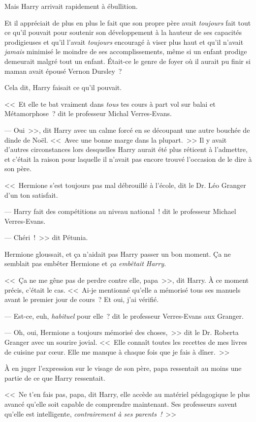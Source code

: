 Mais Harry arrivait rapidement à ébullition.

Et il appréciait de plus en plus le fait que son propre père avait \emph{toujours} fait tout ce qu'il pouvait pour soutenir son développement à la hauteur de ses capacités prodigieuses et qu'il l'avait \emph{toujours} encouragé à viser plus haut et qu'il n'avait \emph{jamais} minimisé le moindre de ses accomplissements, même si un enfant prodige demeurait malgré tout un enfant. Était-ce le genre de foyer où il aurait pu finir si maman avait épousé Vernon Dursley~?

Cela dit, Harry faisait ce qu'il pouvait.

<<~Et elle te bat vraiment dans \emph{tous} tes cours à part vol sur balai et Métamorphose~? dit le professeur Michal Verres-Evans.

--- Oui~>>, dit Harry avec un calme forcé en se découpant une autre bouchée de dinde de Noël. <<~Avec une bonne marge dans la plupart.~>> Il y avait d'autres circonstances lors desquelles Harry aurait été plus réticent à l'admettre, et c'était la raison pour laquelle il n'avait pas encore trouvé l'occasion de le dire à son père.

<<~Hermione s'est toujours pas mal débrouillé à l'école, dit le Dr. Léo Granger d'un ton satisfait.

--- Harry fait des compétitions au niveau national~! dit le professeur Michael Verres-Evans.

--- Chéri~!~>> dit Pétunia.

Hermione gloussait, et ça n'aidait pas Harry passer un bon moment. Ça ne semblait pas embêter Hermione et \emph{ça embêtait Harry.}

<<~Ça ne me gêne pas de perdre contre elle, papa~>>, dit Harry. À ce moment précis, c'était le cas. <<~Ai-je mentionné qu'elle a mémorisé tous ses manuels avant le premier jour de cours~? Et oui, j'ai vérifié.

--- Est-ce, euh, \emph{habituel} pour elle~? dit le professeur Verres-Evans aux Granger.

--- Oh, oui, Hermione a toujours mémorisé des choses,~>> dit le Dr. Roberta Granger avec un sourire jovial. <<~Elle connaît toutes les recettes de mes livres de cuisine par cœur. Elle me manque à chaque fois que je fais à dîner.~>>

À en juger l'expression sur le visage de son père, papa ressentait au moins une partie de ce que Harry ressentait.

<<~Ne t'en fais pas, papa, dit Harry, elle accède au matériel pédagogique le plus avancé qu'elle soit capable de comprendre maintenant. Ses professeurs savent qu'elle est intelligente, \emph{contrairement à ses parents~!}~>>

